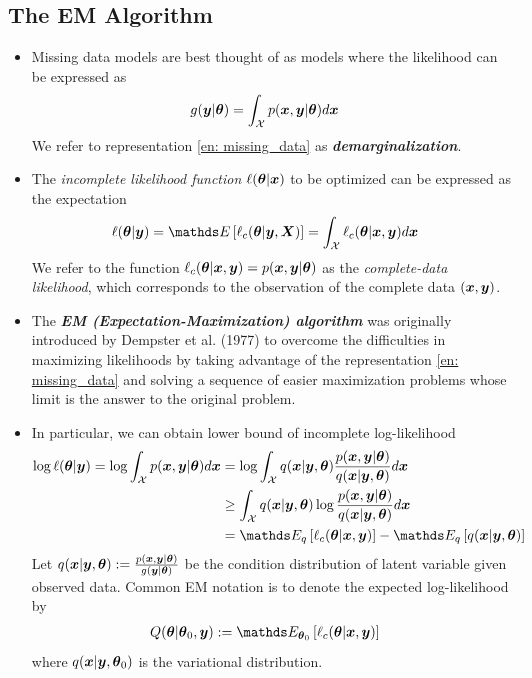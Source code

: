 \documentclass[11pt]{article}
\begin{document}
\subsection{The EM Algorithm}
\begin{itemize}
\item Missing data models are best thought of as models where the likelihood
can be expressed as
\begin{align}
g( \boldsymbol{y} | \boldsymbol{\theta} ) &= \int_{{\mathcal X}} p(\boldsymbol{x}, \boldsymbol{y} | \boldsymbol{\theta}) d\boldsymbol{x} \label{en: missing_data}
\end{align} We refer to representation \eqref{en: missing_data} as \emph{\textbf{demarginalization}}.

\item The \emph{incomplete likelihood function} $\ell(\boldsymbol{\theta}|\boldsymbol{x})$ to be optimized can be expressed
as the expectation
\begin{align*}
\ell(\mb{\theta}|\mb{y}) &= \E{}{\ell_{c}(\mb{\theta}|\mb{y}, \mb{X})} = \int_{\cX}\ell_{c}(\mb{\theta}|\mb{x}, \mb{y})d\mb{x}
\end{align*} We refer to the function $\ell_{c}(\boldsymbol{\theta}|\boldsymbol{x}, \boldsymbol{y}) = p(\boldsymbol{x}, \boldsymbol{y} | \boldsymbol{\theta})$ as the \emph{complete-data likelihood}, which corresponds to the observation of the complete data $(\boldsymbol{x}, \boldsymbol{y})$. 

\item The \emph{\textbf{EM (Expectation-Maximization) algorithm}} was originally introduced by Dempster et al. (1977) to overcome the difficulties in maximizing likelihoods by taking advantage of the representation \eqref{en: missing_data} and solving a sequence of easier maximization problems whose limit is the answer to the original problem. 

\item In particular, we can obtain lower bound of incomplete log-likelihood
\begin{align*}
\log\ell(\mb{\theta}|\mb{y})  = \log \int_{\cX}p(\mb{x}, \mb{y} | \mb{\theta})d\mb{x} 
&= \log \int_{\cX} q(\mb{x}|\mb{y},\mb{\theta}) \frac{p(\mb{x}, \mb{y} | \mb{\theta})}{q(\mb{x}|\mb{y},\mb{\theta})}  d\mb{x} \\
&\ge \int_{\cX}q(\mb{x}|\mb{y},\mb{\theta})\log\frac{p(\mb{x}, \mb{y} | \mb{\theta})}{q(\mb{x}|\mb{y},\mb{\theta})}  d\mb{x}  \\
&= \E{q}{\ell_{c}(\mb{\theta}|\mb{x}, \mb{y})} - \E{q}{q(\mb{x}|\mb{y},\mb{\theta})}
\end{align*} Let $q(\boldsymbol{x}|\boldsymbol{y},\boldsymbol{\theta}):= \frac{p(\boldsymbol{x}, \boldsymbol{y} | \boldsymbol{\theta})}{g(\boldsymbol{y}| \boldsymbol{\theta})}$ be the condition distribution of latent variable given observed data. Common EM notation is to denote the expected log-likelihood by
\begin{align*}
Q(\mb{\theta}|\mb{\theta}_{0}, \mb{y}) &:= \E{\mb{\theta}_{0}}{\ell_{c}(\mb{\theta}|\mb{x}, \mb{y})} 
\end{align*} where $q(\boldsymbol{x}|\boldsymbol{y},\boldsymbol{\theta}_0)$ is the variational distribution.


\end{itemize}
\end{document}

